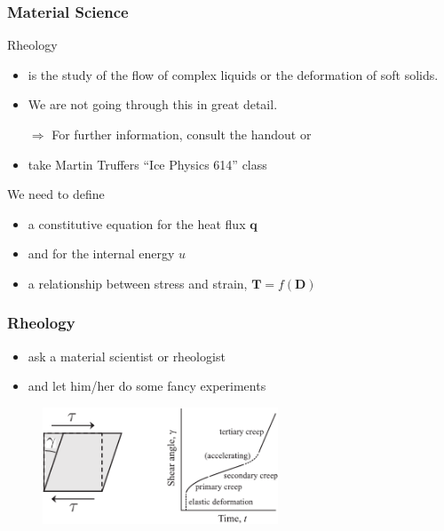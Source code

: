 \documentclass[hide notes,intlimits]{beamer}
\begin{document}
\begin{frame}
  \frametitle{Material Science}
  \begin{block}{Rheology}
    \begin{itemize}
    \item is the study of the flow of complex liquids or the deformation of soft solids.
    \item We are not going through this in great detail.
    \item[$\Rightarrow$] For further information, consult the handout or
      \item take Martin Truffers ``Ice Physics 614''  class
    \end{itemize}
  \end{block}
  \begin{block}{We need to define}
    \begin{itemize}
    \item a constitutive equation for the heat flux $\mathbf{q}$
    \item and for the internal energy $u$
    \item a relationship between stress and strain, $\mathbf{T} = f(\mathbf{D})$
   \end{itemize}
  \end{block}
\end{frame}


\begin{frame}
  \frametitle{Rheology}
  \begin{itemize}
    \item ask a material scientist or rheologist
    \item and let him/her do some fancy experiments
 \end{itemize}
  \begin{figure}
  \includegraphics[width=7cm]{figures/fig_4_04}
  \end{figure}
\end{frame}
\end{document}
